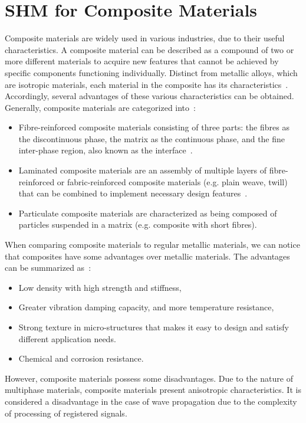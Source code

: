 \section[SHM for Composite Materials]{SHM for Composite Materials}
\label{sec21}
Composite materials are widely used in various industries, due to their useful characteristics. 
A composite material can be described as a compound of two or more different materials to acquire new features that cannot be achieved by specific components functioning individually.
Distinct from metallic alloys, which are isotropic materials, each material in the composite has its characteristics~\cite{Campbell2010}.
Accordingly, several advantages of these various characteristics can be obtained. 
Generally, composite materials are categorized into~\cite{Jones1999}:
\begin{itemize}
	\item Fibre-reinforced composite materials consisting of three parts: the fibres as the discontinuous phase, the matrix as the continuous phase, and the fine inter-phase region, also known as the interface~\cite{Cantwell1991}.
	\item Laminated composite materials are an assembly of multiple layers of fibre-reinforced or fabric-reinforced composite materials (e.g. plain weave, twill) that can be combined to implement necessary design features~\cite{Ramirez1999}.
	\item Particulate composite materials are characterized as being composed of particles suspended in a matrix (e.g. composite with short fibres).
\end{itemize}

When comparing composite materials to regular metallic materials, we can notice that composites have some advantages over metallic materials. 
The advantages can be summarized as~\cite{Campbell2010}:
\begin{itemize}
	\item Low density with high strength and stiffness,
	\item Greater vibration damping capacity, and more temperature resistance,
	\item Strong texture in micro-structures that makes it easy to design and 
	satisfy different application needs. 
	\item Chemical and corrosion resistance.	
\end{itemize}

However, composite materials possess some disadvantages.
Due to the nature of multiphase materials, composite materials present anisotropic characteristics. 
It is considered a disadvantage in the case of wave propagation due to the complexity of processing of registered signals. 

